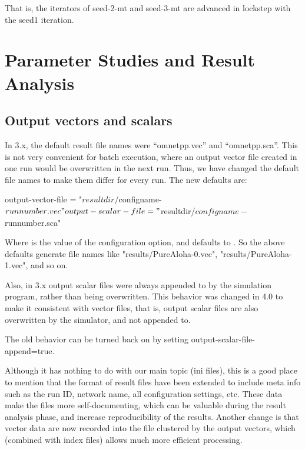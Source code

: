 That is, the iterators of seed-2-mt and seed-3-mt are advanced
in lockstep with the seed1 iteration.


\section{Parameter Studies and Result Analysis}

\subsection{Output vectors and scalars}

In {\opp} 3.x, the default result file names were ``omnetpp.vec'' and
``omnetpp.sca''. This is not very convenient for batch execution, where
an output vector file created in one run would be overwritten in the
next run. Thus, we have changed the default file names to make them
differ for every run. The new defaults are:

\begin{inifile}
output-vector-file = "${resultdir}/${configname}-${runnumber}.vec"
output-scalar-file = "${resultdir}/${configname}-${runnumber}.sca"
\end{inifile}

Where  is the value of the  configuration
option, and defaults to . So the above defaults generate
file names like "results/PureAloha-0.vec", "results/PureAloha-1.vec",
and so on.

Also, in {\opp} 3.x output scalar files were always appended to by the
simulation program, rather than being overwritten. This behavior was
changed in 4.0 to make it consistent with vector files, that is, output
scalar files are also overwritten by the simulator, and not appended
to.

\begin{note}
    The old behavior can be turned back on by setting
    output-scalar-file-append=true.
\end{note}


Although it has nothing to do with our main topic (ini files), this is a
good place to mention that the format of result files have been
extended to include meta info such as the run ID, network name, all
configuration settings, etc. These data make the files more
self-documenting, which can be valuable during the result analysis
phase, and increase reproducibility of the results. Another change is
that vector data are now recorded into the file clustered by the output
vectors, which (combined with index files) allows much more efficient
processing.


